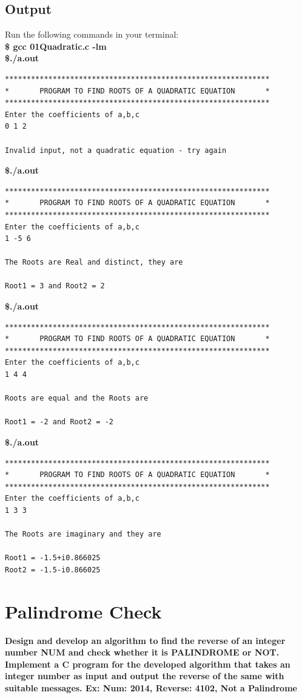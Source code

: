 \documentclass[a4paper]{report}
\begin{document}
\section*{Output}
Run the following commands in your terminal:\\
\textbf{\$ gcc 01Quadratic.c -lm \\ \$./a.out }
\begin{Verbatim}
*************************************************************
*       PROGRAM TO FIND ROOTS OF A QUADRATIC EQUATION       *
*************************************************************
Enter the coefficients of a,b,c 
0 1 2

Invalid input, not a quadratic equation - try again
\end{Verbatim}
\textbf{\$./a.out }
\begin{Verbatim}
*************************************************************
*       PROGRAM TO FIND ROOTS OF A QUADRATIC EQUATION       *
*************************************************************
Enter the coefficients of a,b,c 
1 -5 6

The Roots are Real and distinct, they are 

Root1 = 3 and Root2 = 2
\end{Verbatim}
\textbf{\$./a.out }
\begin{Verbatim}
*************************************************************
*       PROGRAM TO FIND ROOTS OF A QUADRATIC EQUATION       *
*************************************************************
Enter the coefficients of a,b,c 
1 4 4

Roots are equal and the Roots are 

Root1 = -2 and Root2 = -2
\end{Verbatim}
\textbf{\$./a.out }
\begin{Verbatim}
*************************************************************
*       PROGRAM TO FIND ROOTS OF A QUADRATIC EQUATION       *
*************************************************************
Enter the coefficients of a,b,c 
1 3 3

The Roots are imaginary and they are

Root1 = -1.5+i0.866025
Root2 = -1.5-i0.866025
\end{Verbatim}


\chapter{Palindrome Check}
{\selectfont \textbf{Design and develop an algorithm to find the reverse of an integer number NUM and
check whether it is PALINDROME or NOT. Implement a C program for the developed algorithm that takes an integer number as input and output the reverse of the same with suitable messages. Ex: Num: 2014, Reverse: 4102, Not a Palindrome
}}
\end{document}
